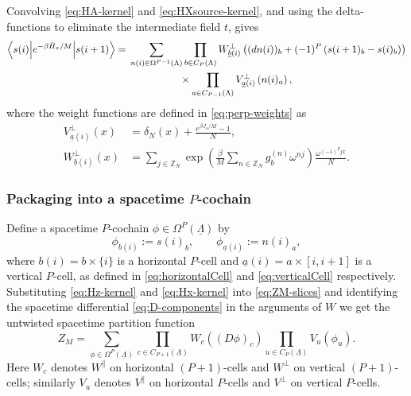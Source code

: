 Convolving \eqref{eq:HA-kernel} and \eqref{eq:HXsource-kernel}, and using the
delta-functions to eliminate the intermediate field \(t\), gives
\begin{equation}
	\begin{aligned}
		\left\langle s(i) \middle| e^{-\beta\hat H_x/M} \middle| s(i+1) \right\rangle
		=&\;
		\sum_{n(i)\in\Omega^{P-1}(\Lambda)}
		\prod_{b\in C_P(\Lambda)}
		W_{\underline b(i)}^{\perp}
		\left(
		(dn(i))_b+(-1)^P\left(s(i+1)_b-s(i)_b\right)
		\right)
		\\
		&\; \hspace{5em} \times 
		\prod_{a\in C_{P-1}(\Lambda)}
		V_{\underline a(i)}^{\perp}\left(n(i)_a\right),
	\end{aligned}
	\label{eq:Hx-kernel}
\end{equation}
where the weight functions are defined in \eqref{eq:perp-weights} as
\begin{subequations}
	\begin{align}
		V_{\underline a(i)}^{\perp}(x)
		&=
		\delta_N(x)+\frac{e^{\beta J_a/M}-1}{N},
		\label{eq:Vperp}
		\\
		W_{\underline b(i)}^{\perp}(x)
		&=
		\sum_{j\in\mathbb Z_N}
		\exp\left(
		\frac{\beta}{M}\sum_{n\in\mathbb Z_N}g_b^{(n)}\omega^{nj}
		\right)
		\frac{\omega^{(-1)^Pjx}}{N}.
		\label{eq:Wperp}
	\end{align}
\end{subequations}

\subsubsection{Packaging into a spacetime \(P\)-cochain}
\label{app:ns2phi}

Define a spacetime \(P\)-cochain \(\phi\in\Omega^P(\underline\Lambda)\) by
\begin{equation}
	\phi_{b(i)}:=s(i)_b,
	\qquad
	\phi_{\underline a(i)}:=n(i)_a,
	\label{eq:phi-def}
\end{equation}
where \(b(i)=b\times\{i\}\) is a horizontal \(P\)-cell and
\(\underline a(i)=a\times[i,i+1]\) is a vertical \(P\)-cell, as defined in \eqref{eq:horizontalCell} and \eqref{eq:verticalCell} respectively.  Substituting \eqref{eq:Hz-kernel} and \eqref{eq:Hx-kernel} into
\eqref{eq:ZM-slices} and identifying the spacetime differential \eqref{eq:D-components} in the arguments of $W$ we get the untwisted spacetime partition function
\begin{equation}
	Z_M
	=
	\sum_{\phi\in\Omega^P(\underline\Lambda)}
	\prod_{c\in C_{P+1}(\underline\Lambda)}
	W_c\left((D\phi)_c\right)
	\prod_{u\in C_P(\underline\Lambda)}
	V_u(\phi_u).
	\label{eq:untwisted-spacetime}
\end{equation}
Here \(W_c\) denotes \(W^\parallel\) on horizontal \((P+1)\)-cells and \(W^\perp\) on
vertical \((P+1)\)-cells; similarly \(V_u\) denotes \(V^\parallel\) on horizontal
\(P\)-cells and \(V^\perp\) on vertical \(P\)-cells.



